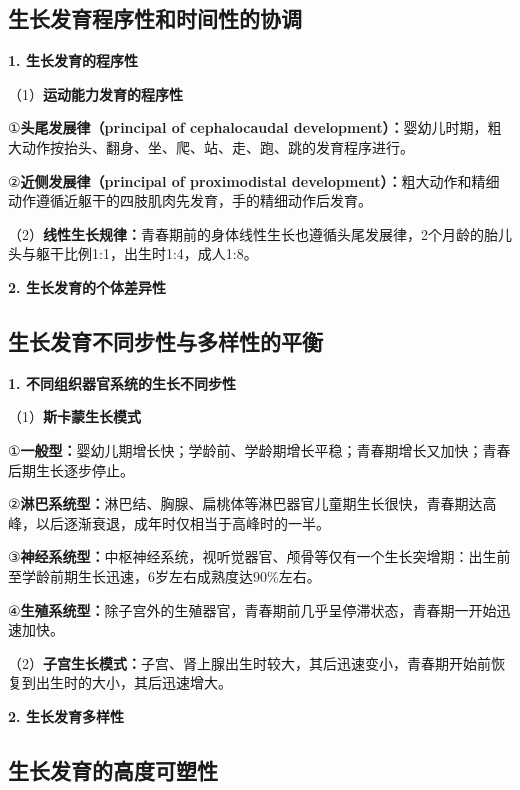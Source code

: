 \subsection{生长发育程序性和时间性的协调}

\begin{keybox}
\textbf{1. 生长发育的程序性}

（1）\textbf{运动能力发育的程序性}

①\textbf{头尾发展律（principal of cephalocaudal development）：}婴幼儿时期，粗大动作按抬头、翻身、坐、爬、站、走、跑、跳的发育程序进行。

②\textbf{近侧发展律（principal of proximodistal development）：}粗大动作和精细动作遵循近躯干的四肢肌肉先发育，手的精细动作后发育。

（2）\textbf{线性生长规律：}青春期前的身体线性生长也遵循头尾发展律，2个月龄的胎儿头与躯干比例1:1，出生时1:4，成人1:8。

\textbf{2. 生长发育的个体差异性}
\end{keybox}

\subsection{生长发育不同步性与多样性的平衡}

\begin{keybox}
\textbf{1. 不同组织器官系统的生长不同步性}

（1）\textbf{斯卡蒙生长模式}

①\textbf{一般型：}婴幼儿期增长快；学龄前、学龄期增长平稳；青春期增长又加快；青春后期生长逐步停止。

②\textbf{淋巴系统型：}淋巴结、胸腺、扁桃体等淋巴器官儿童期生长很快，青春期达高峰，以后逐渐衰退，成年时仅相当于高峰时的一半。

③\textbf{神经系统型：}中枢神经系统，视听觉器官、颅骨等仅有一个生长突增期：出生前至学龄前期生长迅速，6岁左右成熟度达90\%左右。

④\textbf{生殖系统型：}除子宫外的生殖器官，青春期前几乎呈停滞状态，青春期一开始迅速加快。

（2）\textbf{子宫生长模式：}子宫、肾上腺出生时较大，其后迅速变小，青春期开始前恢复到出生时的大小，其后迅速增大。

\textbf{2. 生长发育多样性}
\end{keybox}

\subsection{生长发育的高度可塑性}

